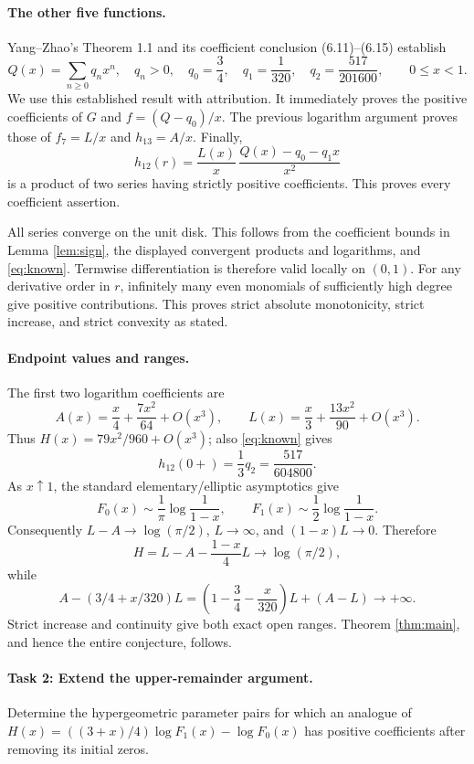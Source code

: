 \documentclass[11pt]{article}
\begin{document}
\paragraph{The other five functions.}
Yang--Zhao's Theorem 1.1 and its coefficient conclusion
(6.11)--(6.15) \cite{YZ} establish
\begin{equation}\label{eq:known}
 Q(x)=\sum_{n\geq0}q_nx^n,\quad
 q_n>0,\quad q_0=\frac34,\quad q_1=\frac1{320},\quad
 q_2=\frac{517}{201600},\qquad 0\leq x<1.
\end{equation}
We use this established result with attribution.
It immediately proves the positive coefficients of \(G\) and
\(f=(Q-q_0)/x\). The previous logarithm argument proves those
of \(f_7=L/x\) and \(h_{13}=A/x\). Finally,
\[
 h_{12}(r)
 =\frac{L(x)}x\,
   \frac{Q(x)-q_0-q_1x}{x^2}
\]
is a product of two series having strictly positive coefficients.
This proves every coefficient assertion.

All series converge on the unit disk. This follows from the
coefficient bounds in Lemma \ref{lem:sign}, the displayed convergent
products and logarithms, and \eqref{eq:known}. Termwise
differentiation is therefore valid locally on \((0,1)\).
For any derivative order in \(r\), infinitely many even monomials
of sufficiently high degree give positive contributions.
This proves strict absolute monotonicity, strict increase,
and strict convexity as stated.

\paragraph{Endpoint values and ranges.}
The first two logarithm coefficients are
\[
 A(x)=\frac x4+\frac{7x^2}{64}+O(x^3),\qquad
 L(x)=\frac x3+\frac{13x^2}{90}+O(x^3).
\]
Thus \(H(x)=79x^2/960+O(x^3)\); also \eqref{eq:known} gives
\[
 h_{12}(0+)=\frac13q_2=\frac{517}{604800}.
\]
As \(x\uparrow1\), the standard elementary/elliptic asymptotics give
\[
 F_0(x)\sim\frac1\pi\log\frac1{1-x},\qquad
 F_1(x)\sim\frac12\log\frac1{1-x}.
\]
Consequently \(L-A\to\log(\pi/2)\), \(L\to\infty\), and
\((1-x)L\to0\). Therefore
\[
 H=L-A-\frac{1-x}{4}L\longrightarrow\log(\pi/2),
\]
while
\[
 A-(3/4+x/320)L
 =\left(1-\frac34-\frac{x}{320}\right)L+(A-L)
 \longrightarrow+\infty.
\]
Strict increase and continuity give both exact open ranges.
Theorem \ref{thm:main}, and hence the entire conjecture, follows.

\paragraph{Task 2: Extend the upper-remainder argument.}
Determine the hypergeometric parameter pairs for which an analogue of
\(H(x)=((3+x)/4)\log F_1(x)-\log F_0(x)\) has positive coefficients
after removing its initial zeros.
\end{document}
